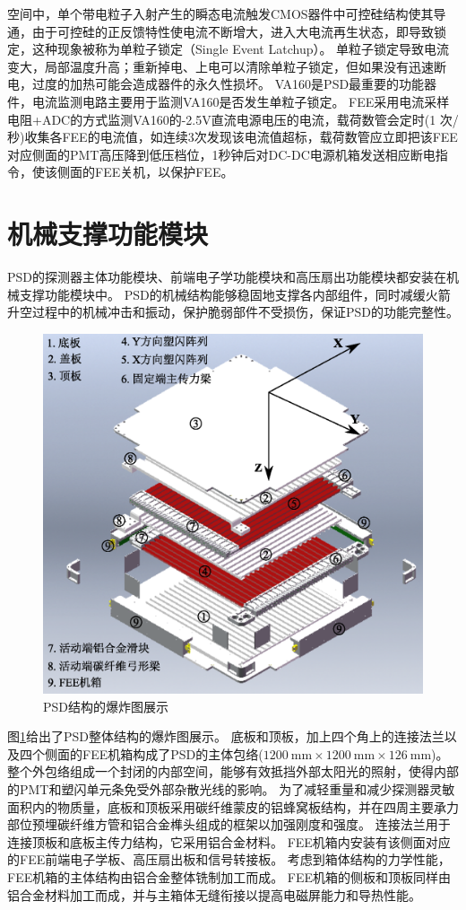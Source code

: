 空间中，单个带电粒子入射产生的瞬态电流触发CMOS器件中可控硅结构使其导通，由于可控硅的正反馈特性使电流不断增大，进入大电流再生状态，即导致锁定，这种现象被称为单粒子锁定（Single Event Latchup）。
单粒子锁定导致电流变大，局部温度升高；重新掉电、上电可以清除单粒子锁定，但如果没有迅速断电，过度的加热可能会造成器件的永久性损坏。
VA160是PSD最重要的功能器件，电流监测电路主要用于监测VA160是否发生单粒子锁定。
FEE采用电流采样电阻+ADC的方式监测VA160的-2.5V直流电源电压的电流，载荷数管会定时(1 次/秒)收集各FEE的电流值，如连续3次发现该电流值超标，载荷数管应立即把该FEE对应侧面的PMT高压降到低压档位，1秒钟后对DC-DC电源机箱发送相应断电指令，使该侧面的FEE关机，以保护FEE。


\section{机械支撑功能模块}
\label{sec:description:psd_support}
PSD的探测器主体功能模块、前端电子学功能模块和高压扇出功能模块都安装在机械支撑功能模块中。
PSD的机械结构能够稳固地支撑各内部组件，同时减缓火箭升空过程中的机械冲击和振动，保护脆弱部件不受损伤，保证PSD的功能完整性。

\begin{figure}[h!]
	\centering
	\includegraphics[width=0.8\linewidth]{chap/description/fig/psd_explosion.eps}
	\caption{PSD结构的爆炸图展示}
	\label{fig:description:psd_structure}
\end{figure}

图\ref*{fig:description:psd_structure}给出了PSD整体结构的爆炸图展示。
底板和顶板，加上四个角上的连接法兰以及四个侧面的FEE机箱构成了PSD的主体包络($\SI{1200}{\milli\meter}\times\SI{1200}{\milli\meter}\times\SI{126}{\milli\meter}$)。
整个外包络组成一个封闭的内部空间，能够有效抵挡外部太阳光的照射，使得内部的PMT和塑闪单元条免受外部杂散光线的影响。
为了减轻重量和减少探测器灵敏面积内的物质量，底板和顶板采用碳纤维蒙皮的铝蜂窝板结构，并在四周主要承力部位预埋碳纤维方管和铝合金榫头组成的框架以加强刚度和强度。
连接法兰用于连接顶板和底板主传力结构，它采用铝合金材料。
FEE机箱内安装有该侧面对应的FEE前端电子学板、高压扇出板和信号转接板。
考虑到箱体结构的力学性能，FEE机箱的主体结构由铝合金整体铣制加工而成。
FEE机箱的侧板和顶板同样由铝合金材料加工而成，并与主箱体无缝衔接以提高电磁屏能力和导热性能。

